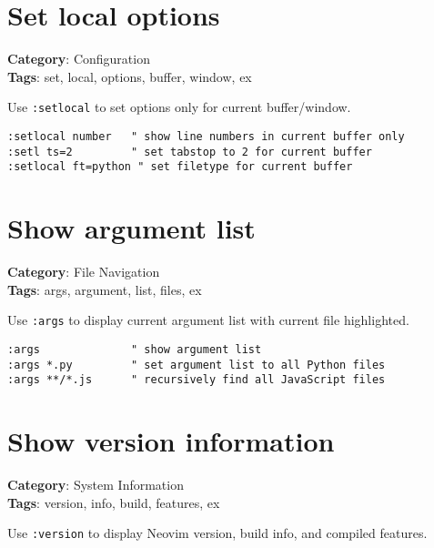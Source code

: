 {{{{{{\section{Set local options}

\textbf{Category}: Configuration\\ \textbf{Tags}: set, local, options, buffer, window, ex
\vspace{0.5cm}

Use {\footnotesize \Verb§:setlocal§} to set options only for current buffer/window.

\begin{Exa*}{}
\begin{Verbatim}[fontsize=\footnotesize, breaklines, breakanywhere]
:setlocal number   " show line numbers in current buffer only
:setl ts=2         " set tabstop to 2 for current buffer
:setlocal ft=python " set filetype for current buffer
\end{Verbatim}
\end{Exa*}

\section{Show argument list}

\textbf{Category}: File Navigation\\ \textbf{Tags}: args, argument, list, files, ex
\vspace{0.5cm}

Use {\footnotesize \Verb§:args§} to display current argument list with current file highlighted.

\begin{Exa*}{}
\begin{Verbatim}[fontsize=\footnotesize, breaklines, breakanywhere]
:args              " show argument list
:args *.py         " set argument list to all Python files
:args **/*.js      " recursively find all JavaScript files
\end{Verbatim}
\end{Exa*}

\section{Show version information}

\textbf{Category}: System Information\\ \textbf{Tags}: version, info, build, features, ex
\vspace{0.5cm}

Use {\footnotesize \Verb§:version§} to display Neovim version, build info, and compiled features.

}}}}}}
